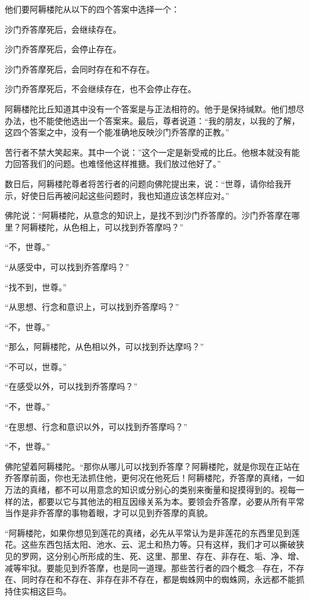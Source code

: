 \documentclass[12pt,twoside,openany]{book}
\begin{document}
他们要阿耨楼陀从以下的四个答案中选择一个：

沙门乔答摩死后，会继续存在。

沙门乔答摩死后，会停止存在。

沙门乔答摩死后，会同时存在和不存在。

沙门乔答摩死后，不会继续存在，也不会停止存在。

阿耨楼陀比丘知道其中没有一个答案是与正法相符的。他于是保持缄默。他们想尽办法，也不能使他选出一个答案来。最后，尊者说道：“我的朋友，以我的了解，这四个答案之中，没有一个能准确地反映沙门乔答摩的正教。”

苦行者不禁大笑起来。其中一个说：”这个一定是新受戒的比丘。他根本就没有能力回答我们的问题。也难怪他这样推搪。我们放过他好了。”

数日后，阿耨楼陀尊者将苦行者的问题向佛陀提出来，说：“世尊，请你给我开示，好使日后再被问起这些问题时，我也知道应该怎样应对。”

佛陀说：“阿耨楼陀，从意念的知识上，是找不到沙门乔答摩的。沙门乔答摩在哪里？阿耨楼陀，从色相上，可以找到乔答摩吗？”

“不，世尊。”

“从感受中，可以找到乔答摩吗？”

“找不到，世尊。”

“从思想、行念和意识上，可以找到乔答摩吗？”

“不，世尊。”

“那么，阿耨楼陀，从色相以外，可以找到乔达摩吗？”

“不可以，世尊。”

“在感受以外，可以找到乔答摩吗？”

“不，世尊。”

“在思想、行念和意识以外，可以找到乔答摩吗？”

“不，世尊。”

佛陀望着阿耨楼陀。“那你从哪儿可以找到乔答摩？阿耨楼陀，就是你现在正站在乔答摩前面，你也无法抓住他，更何况在他死后！阿耨楼陀，乔答摩的真绪，一如万法的真绪，都不可以用意念的知识或分别心的类别来衡量和捉摸得到的。视每一样的法，都要以它与其他法的相互因缘关系为本。要领会乔答摩，必要从所有平常当作是非乔答摩的事物着眼，才可以见到乔答摩的真貌。

“阿耨楼陀，如果你想见到莲花的真绪，必先从平常认为是非莲花的东西里见到莲花。这些东西包括太阳、池水、云、泥土和热力等。只有这样，我们才可以撕破狭见的罗网，这分别心所形成的生、死、这里、那里、存在、非存在、垢、净、增、减等牢狱。要能见到乔答摩，也是同一道理。那些苦行者的四个概念---存在，不存在、同时存在和不存在、非存在非不存在，都是蜘蛛网中的蜘蛛网，永远都不能抓持住实相这巨鸟。
\end{document}
